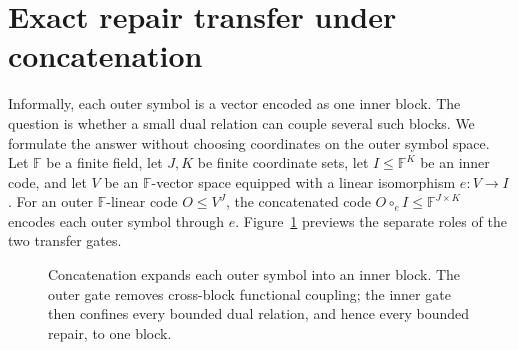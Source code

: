 \documentclass[11pt]{article}
\theoremstyle{definition}
\theoremstyle{remark}
\newcommand{\F}{\mathbb{F}}
\begin{document}
\section{Exact repair transfer under concatenation}
\label{sec:transfer}

Informally, each outer symbol is a vector encoded as one inner block.  The
question is whether a small dual relation can couple several such blocks.
We formulate the answer without choosing coordinates on the outer symbol
space.  Let $\F$ be a finite field, let $J,K$ be finite coordinate sets,
let $I\leq
\F^K$ be an inner code, and let $V$ be an $\F$-vector space equipped with a
linear isomorphism $e:V\to I$.  For an outer $\F$-linear code
$O\leq V^J$, the concatenated code $O\circ_e I\leq\F^{J\times K}$ encodes
each outer symbol through $e$.  Figure~\ref{fig:block-confinement} previews
the separate roles of the two transfer gates.

\begin{figure}[ht]
\centering
{}
\caption{Concatenation expands each outer symbol into an inner block.  The
outer gate removes cross-block functional coupling; the inner gate then
confines every bounded dual relation, and hence every bounded repair, to one
block.}
\label{fig:block-confinement}
\end{figure}
\end{document}
